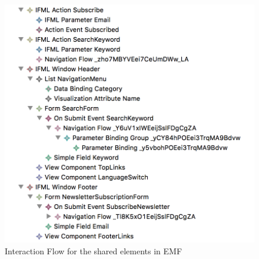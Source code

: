 \vspace{0.5cm}
\begin{figure}[H]
  \centering
    \includegraphics[width=12cm]{images/diagrams/before/ifml-hierarchy-headersearchfooter.png}
  \caption{Interaction Flow for the shared elements in EMF}
  \label{fig:ifml-before-hierarchy-headersearchfooter}
\end{figure}
\vspace{0.5cm}

